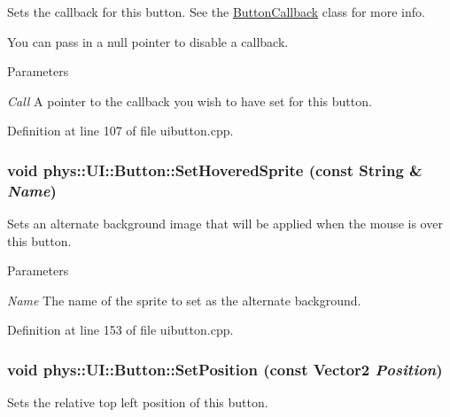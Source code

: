 Sets the callback for this button. See the \hyperlink{classphys_1_1UI_1_1ButtonCallback}{ButtonCallback} class for more info. 

You can pass in a null pointer to disable a callback. 
\begin{DoxyParams}{Parameters}
\item[{\em Call}]A pointer to the callback you wish to have set for this button. \end{DoxyParams}


Definition at line 107 of file uibutton.cpp.

\hypertarget{classphys_1_1UI_1_1Button_a12cfac0dcc6324694f29968c0ca25d03}{
\subsubsection[{SetHoveredSprite}]{\setlength{\rightskip}{0pt plus 5cm}void phys::UI::Button::SetHoveredSprite (const {\bf String} \& {\em Name})}}
\label{d8/d88/classphys_1_1UI_1_1Button_a12cfac0dcc6324694f29968c0ca25d03}


Sets an alternate background image that will be applied when the mouse is over this button. 


\begin{DoxyParams}{Parameters}
\item[{\em Name}]The name of the sprite to set as the alternate background. \end{DoxyParams}


Definition at line 153 of file uibutton.cpp.

\hypertarget{classphys_1_1UI_1_1Button_a9bfcd08b027c80130dd2c7e6af119da5}{
\subsubsection[{SetPosition}]{\setlength{\rightskip}{0pt plus 5cm}void phys::UI::Button::SetPosition (const {\bf Vector2} {\em Position})}}
\label{d8/d88/classphys_1_1UI_1_1Button_a9bfcd08b027c80130dd2c7e6af119da5}


Sets the relative top left position of this button. 


